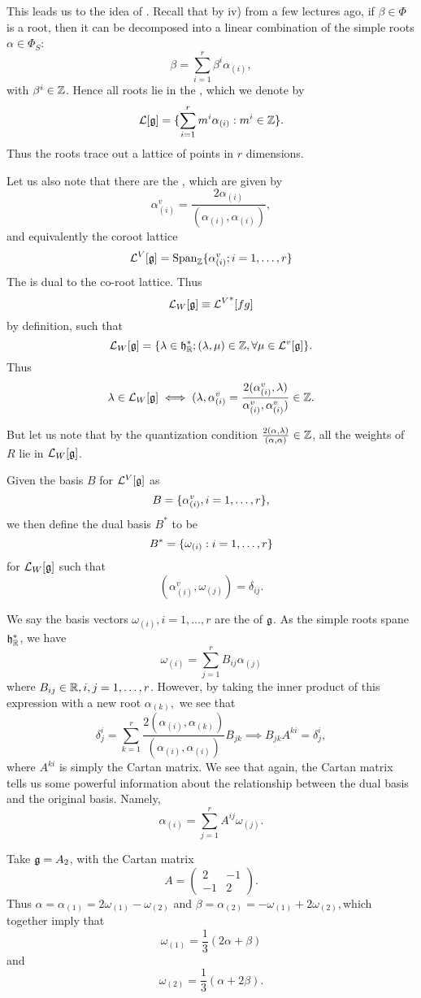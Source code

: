 This leads us to the idea of . Recall that by iv) from a few lectures ago, if $\beta \in \Phi$ is a root, then it can be decomposed into a linear combination of the simple roots $\alpha\in \Phi_S$:
$$\beta =\sum_{i=1}^r \beta^i \alpha_{(i)},$$
with $\beta^i \in \mathbb{Z}$. Hence all roots lie in the , which we denote by
$$\mathcal{L}[\mathfrak{g}]=\{\sum_{i=1}^r m^i \alpha_{(i)}:m^i \in \mathbb{Z}\}.$$
Thus the roots trace out a lattice of points in $r$ dimensions.
\begin{defn}
    Let us also note that there are the , which are given by
    $$\alpha^v_{(i)}=\frac{2\alpha_{(i)}}{(\alpha_{(i)},\alpha_{(i)})},$$
    and equivalently the coroot lattice
    $$\mathcal{L}^V[\mathfrak{g}]=\text{Span}_{\mathbb{Z}}\{\alpha_{(i)}^v ; i=1,\ldots,r\}$$
    The  is dual to the co-root lattice. Thus
    $$\mathcal L_W[\mathfrak{g}]\equiv {\mathcal L^V}^* [fg]$$
    by definition, such that
    $$\mathcal L_W[\mathfrak{g}]=\{\lambda\in \mathfrak{h}^*_{\mathbb{R}}; (\lambda,\mu)\in \mathbb{Z}, \forall \mu \in \mathcal L^v[\mathfrak{g}]\}.$$
    Thus $$\lambda \in \mathcal L_W[\mathfrak{g}] \iff (\lambda,\alpha^v_{(i)}=\frac{2(\alpha^v_{(i)},\lambda)}{\alpha^v_{(i)},\alpha^v_{(i)})}\in \mathbb{Z}.$$
\end{defn}
But let us note that by the quantization condition $\frac{2(\alpha,\lambda)}{(\alpha,\alpha)}\in \mathbb{Z}$, all the weights of $R$ lie in $\mathcal L_W[\mathfrak{g}]$. 
\begin{defn}
Given the basis $B$ for $\mathcal L^V[\mathfrak{g}]$ as
$$B=\{\alpha_{(i)}^v,i=1,\ldots,r\},$$
we then define the dual basis $B^*$ to be
$$B^*=\{\omega_{(i)}:i=1,\ldots,r\}$$
for $\mathcal L_W[\mathfrak{g}]$ such that
$$(\alpha_{(i)}^v,\omega_{(j)})=\delta_{ij}.$$
\end{defn}
We say the basis vectors $\omega_{(i)},i=1,\ldots,r$ are the  of $\mathfrak{g}$. As the simple roots spane $\mathfrak{h}^*_{\mathbb{R}}$, we have
$$\omega_{(i)}=\sum_{j=1}^r B_{ij}\alpha_{(j)}$$
where $B_{ij}\in \mathbb{R},i,j=1,\ldots,r$. However, by taking the inner product of this expression with a new root $\alpha_{(k)},$ we see that
$$\delta^i_j = \sum_{k=1}^r \frac{2(\alpha_{(i)},\alpha_{(k)})}{(\alpha_{(i)},\alpha_{(i)})}B_{jk} \implies B_{jk}A^{ki}=\delta^i_j,$$
where $A^{ki}$ is simply the Cartan matrix. We see that again, the Cartan matrix tells us some powerful information about the relationship between the dual basis and the original basis. Namely,
$$\alpha_{(i)}=\sum_{j=1}^r A^{ij}\omega_{(j)}.$$
\begin{exm}
Take $\mathfrak{g}=A_2$, with the Cartan matrix
$$A=\begin{pmatrix}
2&-1\\-1&2
\end{pmatrix}.$$
Thus $\alpha=\alpha_{(1)}=2\omega_{(1)}-\omega_{(2)}$
and $\beta=\alpha_{(2)}=-\omega_{(1)}+2\omega_{(2)},$which together imply that
$$\omega_{(1)}=\frac{1}{3}(2\alpha+\beta)$$ and
$$\omega_{(2)}=\frac{1}{3}(\alpha+2\beta).$$
\end{exm}

